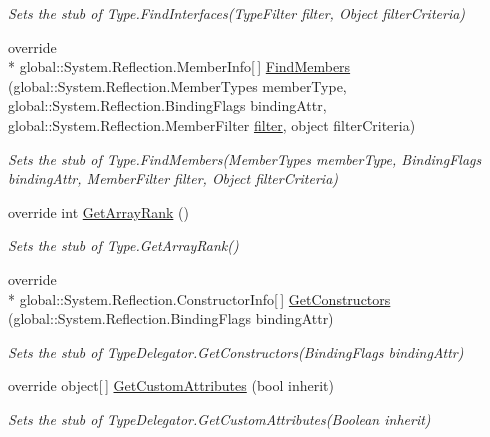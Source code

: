 \begin{DoxyCompactItemize}
\begin{DoxyCompactList}\small\item\em Sets the stub of Type.\-Find\-Interfaces(\-Type\-Filter filter, Object filter\-Criteria)\end{DoxyCompactList}\item 
override \\*
global\-::\-System.\-Reflection.\-Member\-Info\mbox{[}$\,$\mbox{]} \hyperlink{class_system_1_1_reflection_1_1_fakes_1_1_stub_type_delegator_adea42d06afc82f0f49a9a70c685522e9}{Find\-Members} (global\-::\-System.\-Reflection.\-Member\-Types member\-Type, global\-::\-System.\-Reflection.\-Binding\-Flags binding\-Attr, global\-::\-System.\-Reflection.\-Member\-Filter \hyperlink{jquery-1_810_82-vsdoc_8js_ac99d0cf56cab46114f5765a14e03ad6d}{filter}, object filter\-Criteria)
\begin{DoxyCompactList}\small\item\em Sets the stub of Type.\-Find\-Members(\-Member\-Types member\-Type, Binding\-Flags binding\-Attr, Member\-Filter filter, Object filter\-Criteria)\end{DoxyCompactList}\item 
override int \hyperlink{class_system_1_1_reflection_1_1_fakes_1_1_stub_type_delegator_a1b4373237608f26efaff8806e61d95a2}{Get\-Array\-Rank} ()
\begin{DoxyCompactList}\small\item\em Sets the stub of Type.\-Get\-Array\-Rank()\end{DoxyCompactList}\item 
override \\*
global\-::\-System.\-Reflection.\-Constructor\-Info\mbox{[}$\,$\mbox{]} \hyperlink{class_system_1_1_reflection_1_1_fakes_1_1_stub_type_delegator_a045c6c9dfd88ec925f06f580fc08c521}{Get\-Constructors} (global\-::\-System.\-Reflection.\-Binding\-Flags binding\-Attr)
\begin{DoxyCompactList}\small\item\em Sets the stub of Type\-Delegator.\-Get\-Constructors(\-Binding\-Flags binding\-Attr)\end{DoxyCompactList}\item 
override object\mbox{[}$\,$\mbox{]} \hyperlink{class_system_1_1_reflection_1_1_fakes_1_1_stub_type_delegator_acbba8e3ff64ab42e1dd39ed8845e6027}{Get\-Custom\-Attributes} (bool inherit)
\begin{DoxyCompactList}\small\item\em Sets the stub of Type\-Delegator.\-Get\-Custom\-Attributes(\-Boolean inherit)\end{DoxyCompactList}\item 

\end{DoxyCompactItemize}

